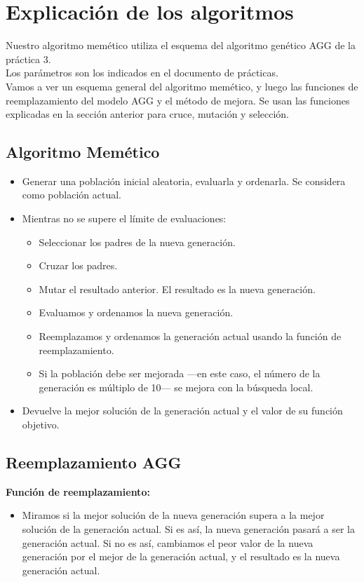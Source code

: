 \section{Explicación de los algoritmos}

Nuestro algoritmo memético utiliza el esquema del algoritmo genético AGG de la práctica 3.\\

Los parámetros son los indicados en el documento de prácticas.\\

Vamos a ver un esquema general del algoritmo memético, y luego las funciones de reemplazamiento del modelo AGG y el método de mejora. Se usan las funciones explicadas en la sección anterior para cruce, mutación y selección.\\

\subsection{Algoritmo Memético}

\begin{itemize}
\item Generar una población inicial aleatoria, evaluarla y ordenarla. Se considera como población actual.
\item Mientras no se supere el límite de evaluaciones:
\begin{itemize}
\item Seleccionar los padres de la nueva generación.
\item Cruzar los padres.
\item Mutar el resultado anterior. El resultado es la nueva generación.
\item Evaluamos y ordenamos la nueva generación.
\item Reemplazamos y ordenamos la generación actual usando la función de reemplazamiento.
\item Si la población debe ser mejorada ---en este caso, el número de la generación es múltiplo de 10--- se mejora con la búsqueda local.
\end{itemize} 
\item Devuelve la mejor solución de la generación actual y el valor de su función objetivo.
\end{itemize} 
\newpage

\subsection{Reemplazamiento AGG}
\textbf{Función de reemplazamiento:}
\begin{itemize}
\item Miramos si la mejor solución de la nueva generación supera a la mejor solución de la generación actual. Si es así, la nueva generación pasará a ser la generación actual. Si no es así, cambiamos el peor valor de la nueva generación por el mejor de la generación actual, y el resultado es la nueva generación actual.
\end{itemize}
